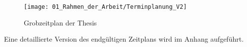 	\begin{figure}[h!]
		\centering
		\texttt{[image: 01\_Rahmen\_der\_Arbeit/Terminplanung\_V2]}
		\caption{Grobzeitplan der Thesis}
		\label{fig:Grobzeitplan}
	\end{figure}
	
	\begin{bfhNoteBox}
		Eine detaillierte Version des endgültigen Zeitplans wird im Anhang aufgeführt.
	\end{bfhNoteBox} 

		